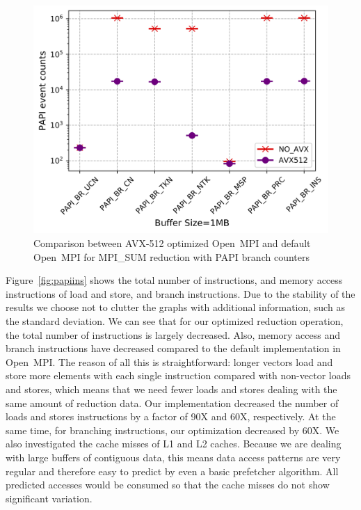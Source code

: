 \documentclass[5p,times,twocolumn]{elsarticle}
\newcommand{\ompi}[0]{Open~MPI\xspace}
\begin{document}
\begin{figure}[h]
    \centering
    \includegraphics[width=\linewidth]{papi_BR_review.png}
    \caption{Comparison between AVX-512 optimized \ompi and default \ompi for MPI\_SUM reduction with PAPI branch counters}
    \label{fig:papibr}
\end{figure}

Figure~\ref{fig:papiins} shows the total number of instructions, and memory access instructions of
load and store, and branch instructions. Due to the
stability of the results we choose not to clutter the graphs with additional information, such as the
standard deviation.
We can see that for our optimized reduction operation, the total number of
instructions is largely decreased. Also, memory access and branch instructions
have decreased compared to the default implementation in \ompi.
The reason of all this is straightforward: longer vectors load and store more
elements with each single instruction compared with non-vector loads and stores, which means that
we need fewer loads and stores dealing with the same amount of reduction data.
%
Our implementation decreased the number of loads and stores instructions
by a factor of 90X and 60X, respectively.  At the same time, for
branching instructions, our optimization decreased by 60X.  We also
investigated the cache misses of L1 and L2 caches. Because we are
dealing with large buffers of contiguous data, this means data access
patterns are very regular and therefore easy to predict by even a basic prefetcher algorithm. All predicted accesses
would be consumed so that the cache misses do not show significant
variation.
\end{document}
